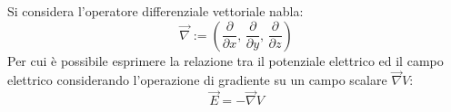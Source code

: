 \documentclass{article}
\numberwithin{equation}{subsection}
\begin{document}
Si considera l'operatore differenziale vettoriale nabla: 
\begin{equation*}
    \vec{\nabla}:=\left(\displaystyle\frac{\partial}{\partial x},\,\frac{\partial}{\partial y},\,\frac{\partial}{\partial z}\right)
\end{equation*}
Per cui è possibile esprimere la relazione tra il potenziale elettrico ed il campo elettrico considerando l'operazione di gradiente su un campo scalare $\vec{\nabla}V$: 
\begin{equation}
    \vec{E}=-\vec{\nabla}V
\end{equation}
\end{document}
